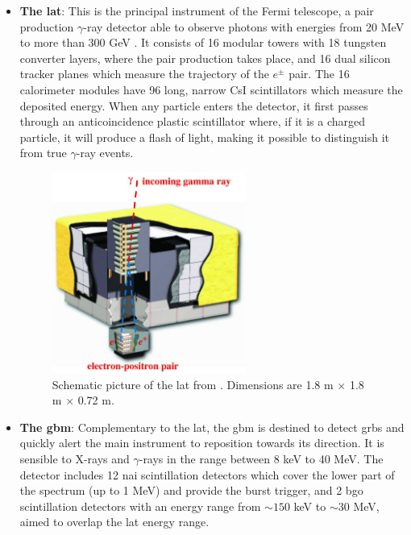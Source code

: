 \documentclass[main.tex]{subfiles}
\begin{document}
\begin{itemize}
    \item \textbf{The \gls{lat}}: This is the principal instrument of the Fermi telescope, a pair production $\gamma$-ray detector able to observe photons with energies from 20 MeV to more than 300 GeV \cite{2009FermiLAT}. It consists of 16 modular towers with 18 tungsten converter layers, where the pair production takes place, and 16 dual silicon tracker planes which measure the trajectory of the $e^{\pm}$ pair. The 16 calorimeter modules have 96 long, narrow CsI scintillators which measure the deposited energy. When any particle enters the detector, it first passes through an anticoincidence plastic scintillator where, if it is a charged particle, it will produce a flash of light, making it possible to distinguish it from true $\gamma$-ray events.\\
    
    \begin{figure}
    \centering
    \includegraphics[width=0.60\textwidth]{Pictures/LAT.pdf}
    \caption{Schematic picture of the \gls{lat} from \cite{2009FermiLAT}. Dimensions are 1.8 m $\times$ 1.8 m $\times$ 0.72 m.}
    \label{fig:LAT}
    \end{figure}
    
    \item \textbf{The \gls{gbm}}: Complementary to the \gls{lat}, the \gls{gbm} is destined to detect \glspl{grb} and quickly alert the main instrument to reposition towards its direction. It is sensible to X-rays and $\gamma$-rays in the range between 8 keV to 40 MeV. The detector includes 12  \gls{nai}  scintillation detectors which cover the lower part of the spectrum (up to 1 MeV) and  provide the burst trigger, and 2 \gls{bgo} scintillation detectors with an energy range from $\sim 150$ keV to $\sim 30$ MeV, aimed to overlap the \gls{lat} energy range. 
    

\end{itemize}
\end{document}
